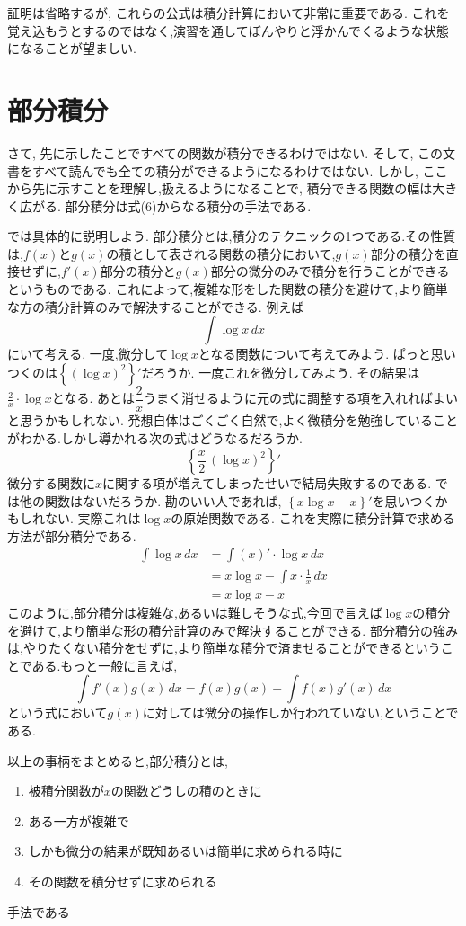 ﻿\documentclass[dvipdfmx,a4paper,11pt,fleqn]{jsarticle}
\begin{document}
証明は省略するが, これらの公式は積分計算において非常に重要である.
これを覚え込もうとするのではなく,演習を通してぼんやりと浮かんでくるような状態になることが望ましい.

\section{部分積分}

さて, 先に示したことですべての関数が積分できるわけではない.
そして, この文書をすべて読んでも全ての積分ができるようになるわけではない.
しかし, ここから先に示すことを理解し,扱えるようになることで, 積分できる関数の幅は大きく広がる.
部分積分は式(6)からなる積分の手法である.

では具体的に説明しよう.
部分積分とは,積分のテクニックの1つである.その性質は,$f(x)$と$g(x)$の積として表される関数の積分において,$g(x)$部分の積分を直接せずに,$f'(x)$部分の積分と$g(x)$部分の微分のみで積分を行うことができるというものである.
これによって,複雑な形をした関数の積分を避けて,より簡単な方の積分計算のみで解決することができる.
例えば
\[
\displaystyle \int \log x\,dx
\]
にいて考える.
一度,微分して$\log x$となる関数について考えてみよう.
ぱっと思いつくのは$\left\{(\log x)^2 \right\}'$だろうか.
一度これを微分してみよう.
その結果は$\displaystyle \frac{2}{x} \cdot \log x$となる.
あとは$\dfrac{2}{x}$うまく消せるように元の式に調整する項を入れればよいと思うかもしれない.
発想自体はごくごく自然で,よく微積分を勉強していることがわかる.しかし導かれる次の式はどうなるだろうか.
\[
\displaystyle \left\{\frac{x}{2}\,(\log x)^2 \right\}'
\]
微分する関数に$x$に関する項が増えてしまったせいで結局失敗するのである.
では他の関数はないだろうか.
勘のいい人であれば, $\left\{x\log x -x\right\}'$を思いつくかもしれない.
実際これは$\log x$の原始関数である.
これを実際に積分計算で求める方法が部分積分である.
\begin{align*}
  \int \log x\,dx
  &=\int (x)'\cdot \log x\,dx\\
  &=x\log x-\int x\cdot \frac{1}{x}\,dx\\
  &=x\log x-x
\end{align*}
このように,部分積分は複雑な,あるいは難しそうな式,今回で言えば$\log x$の積分を避けて,より簡単な形の積分計算のみで解決することができる.
部分積分の強みは,やりたくない積分をせずに,より簡単な積分で済ませることができるということである.もっと一般に言えば,
\[
  \int f'(x)g(x)\,dx  =f(x)g(x)-\int f(x)g'(x)\,dx
\]
という式において$g(x)$に対しては微分の操作しか行われていない,ということである.

以上の事柄をまとめると,部分積分とは,
\begin{enumerate}
  \item 被積分関数が$x$の関数どうしの積のときに
  \item ある一方が複雑で
  \item しかも微分の結果が既知あるいは簡単に求められる時に
  \item その関数を積分せずに求められる
\end{enumerate}
手法である
\end{document}

